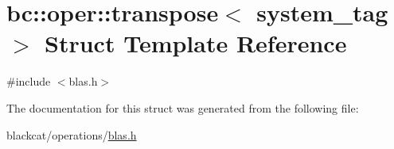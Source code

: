\hypertarget{structbc_1_1oper_1_1transpose}{}\section{bc\+:\+:oper\+:\+:transpose$<$ system\+\_\+tag $>$ Struct Template Reference}
\label{structbc_1_1oper_1_1transpose}


{\ttfamily \#include $<$blas.\+h$>$}



The documentation for this struct was generated from the following file\+:\begin{DoxyCompactItemize}
\item 
blackcat/operations/\hyperlink{operations_2blas_8h}{blas.\+h}\end{DoxyCompactItemize}
